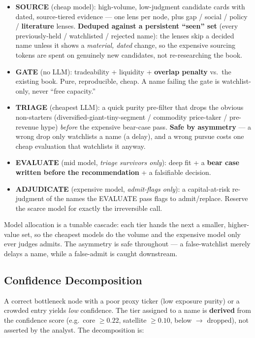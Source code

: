 \documentclass[11pt]{article}
\begin{document}
\begin{itemize}
  \item \textbf{SOURCE} (cheap model): high-volume, low-judgment candidate cards with dated,
    source-tiered evidence --- one lens per node, plus gap / social / policy / \textbf{literature}
    lenses. \textbf{Deduped against a persistent ``seen'' set} (every previously-held / watchlisted /
    rejected name): the lenses skip a decided name unless it shows a \emph{material, dated} change,
    so the expensive sourcing tokens are spent on genuinely new candidates, not re-researching the
    book.

  \item \textbf{GATE} (no LLM): tradeability + liquidity + \textbf{overlap penalty} vs.\ the
    existing book. Pure, reproducible, cheap. A name failing the gate is watchlist-only, never
    ``free capacity.''

  \item \textbf{TRIAGE} (cheapest LLM): a quick purity pre-filter that drops the obvious
    non-starters (diversified-giant-tiny-segment / commodity price-taker / pre-revenue hype)
    \emph{before} the expensive bear-case pass. \textbf{Safe by asymmetry} --- a wrong drop only
    watchlists a name (a delay), and a wrong pursue costs one cheap evaluation that watchlists it
    anyway.

  \item \textbf{EVALUATE} (mid model, \emph{triage survivors only}): deep fit + a \textbf{bear case
    written before the recommendation} + a falsifiable decision.

  \item \textbf{ADJUDICATE} (expensive model, \emph{admit-flags only}): a capital-at-risk
    re-judgment of the names the EVALUATE pass flags to admit/replace. Reserve the scarce model for
    exactly the irreversible call.
\end{itemize}

Model allocation is a tunable cascade: each tier hands the next a smaller, higher-value set, so the
cheapest models do the volume and the expensive model only ever judges admits. The asymmetry is safe
throughout --- a false-watchlist merely delays a name, while a false-admit is caught downstream.

\subsection*{Confidence Decomposition}

A correct bottleneck node with a poor proxy ticker (low exposure purity) or a crowded entry yields
\emph{low} confidence. The tier assigned to a name is \textbf{derived} from the confidence score
(e.g.\ core $\geq 0.22$, satellite $\geq 0.10$, below $\rightarrow$ dropped), not asserted by the
analyst. The decomposition is:
\end{document}
